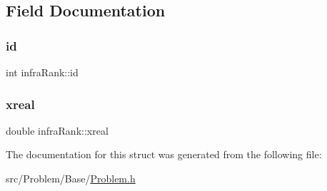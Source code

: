 \subsection{Field Documentation}
\mbox{\label{structinfraRank_ace3640f7fdc691b68111cf07e0eabaae_ace3640f7fdc691b68111cf07e0eabaae}} 
\subsubsection{\texorpdfstring{id}{id}}
{\footnotesize\ttfamily int infra\+Rank\+::id}

\mbox{\label{structinfraRank_a1bb966369809456d65bd4e2d4e19d775_a1bb966369809456d65bd4e2d4e19d775}} 
\subsubsection{\texorpdfstring{xreal}{xreal}}
{\footnotesize\ttfamily double infra\+Rank\+::xreal}



The documentation for this struct was generated from the following file\+:\begin{DoxyCompactItemize}
\item 
src/\+Problem/\+Base/\mbox{\hyperlink{Problem_8h}{Problem.\+h}}\end{DoxyCompactItemize}
